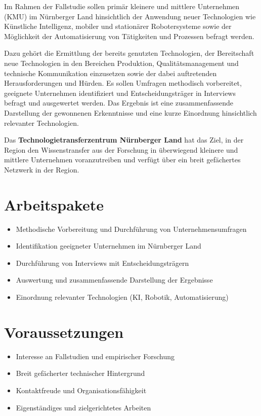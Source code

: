 \documentclass{ohm_project_description}
\begin{document}
\maketitle
\thispagestyle{fancy}

Im Rahmen der Fallstudie sollen primär kleinere und mittlere Unternehmen (KMU) im Nürnberger Land hinsichtlich der Anwendung neuer Technologien wie Künstliche Intelligenz, mobiler und stationärer Robotersysteme sowie der Möglichkeit der Automatisierung von Tätigkeiten und Prozessen befragt werden.

Dazu gehört die Ermittlung der bereits genutzten Technologien, der Bereitschaft neue Technologien in den Bereichen Produktion, Qualitätsmanagement und technische Kommunikation einzusetzen sowie der dabei auftretenden Herausforderungen und Hürden. Es sollen Umfragen methodisch vorbereitet, geeignete Unternehmen identifiziert und Entscheidungsträger in Interviews befragt und ausgewertet werden. Das Ergebnis ist eine zusammenfassende Darstellung der gewonnenen Erkenntnisse und eine kurze Einordnung hinsichtlich relevanter Technologien.

Das \textbf{Technologietransferzentrum Nürnberger Land} hat das Ziel, in der Region den Wissenstransfer aus der Forschung in überwiegend kleinere und mittlere Unternehmen voranzutreiben und verfügt über ein breit gefächertes Netzwerk in der Region.

\section*{Arbeitspakete}
\begin{itemize}[leftmargin=0.5cm]
    \setlength\itemsep{.1em}
    \item Methodische Vorbereitung und Durchführung von Unternehmensumfragen
    \item Identifikation geeigneter Unternehmen im Nürnberger Land
    \item Durchführung von Interviews mit Entscheidungsträgern
    \item Auswertung und zusammenfassende Darstellung der Ergebnisse
    \item Einordnung relevanter Technologien (KI, Robotik, Automatisierung)
\end{itemize}

\section*{Voraussetzungen}
\begin{itemize}[leftmargin=0.5cm]
    \setlength\itemsep{.1em}
    \item Interesse an Fallstudien und empirischer Forschung
    \item Breit gefächerter technischer Hintergrund
    \item Kontaktfreude und Organisationsfähigkeit
    \item Eigenständiges und zielgerichtetes Arbeiten
\end{itemize}
\end{document}
